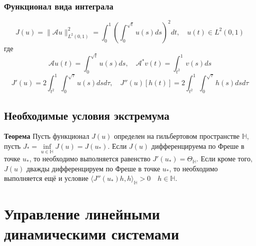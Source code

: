 \documentclass[A4]{article}
\begin{document}
\subsubsection{Функционал вида интеграла}
\begin{equation*}
J(u)=\|\mathcal{A}u\|^2_{L^2(0,1)}=\int_{0}^{1}\left(\int_{0}^{\sqrt{t}}u(s)ds\right)^2dt,\quad u(t)\in L^2(0,1)
\end{equation*}
где
\begin{equation*}
\mathcal{A}u(t)=\int_{0}^{\sqrt{t}}u(s)ds,\quad \mathcal{A}^*v(t)=\int_{t^2}^{1}v(s)ds
\end{equation*}
\begin{equation*}
J'(u)=2\int_{t^2}^{1}\int_{0}^{\sqrt{\tau}}u(s)dsd\tau,\quad J''(u)[h(t)]=2\int_{t^2}^{1}\int_{0}^{\sqrt{\tau}}h(s)dsd\tau
\end{equation*}
\subsection{Необходимые условия экстремума}
\textbf{Теорема} Пусть функционал $J(u)$ определен на гильбертовом пространстве $\mathbb{H}$, пусть $J_*=\inf\limits_{u\in\mathbb{H}}J(u)=J(u_*)$. Если $J(u)$ дифференцируема по Фреше в точке $u_*$, то необходимо выполняется равенство $J'(u_*)=\Theta_{\mathbb{H}}$. Если кроме того, $J(u)$ дважды дифференцируем по Фреше в точке $u_*$, то необходимо выполняется ещё и условие $\langle J''(u_*)h,h\rangle_{\mathbb{H}}>0\quad h\in\mathbb{H}$.
\section{Управление линейными динамическими системами}
\end{document}
